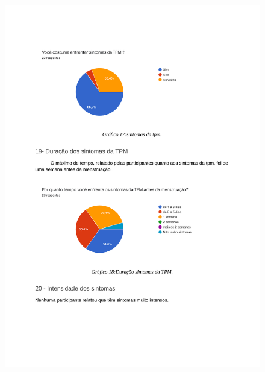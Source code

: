 \begin{apendicesenv}
        \begin{figure}[ht]
            \centering
            \includegraphics[keepaspectratio=true,scale=0.7]{figuras/Tab14.pdf}
        \end{figure}
        

\end{apendicesenv}
